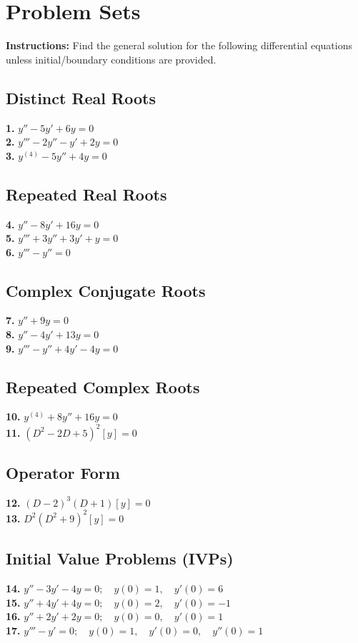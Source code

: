 \documentclass[12pt]{article}
\begin{document}
\newpage

\section{Problem Sets}
\textbf{Instructions:} Find the general solution for the following differential equations unless initial/boundary conditions are provided. 

\subsection*{Distinct Real Roots}
\textbf{1.} $y'' - 5y' + 6y = 0$ \\
\textbf{2.} $y''' - 2y'' - y' + 2y = 0$ \\
\textbf{3.} $y^{(4)} - 5y'' + 4y = 0$

\subsection*{Repeated Real Roots}
\textbf{4.} $y'' - 8y' + 16y = 0$ \\
\textbf{5.} $y''' + 3y'' + 3y' + y = 0$ \\
\textbf{6.} $y''' - y'' = 0$

\subsection*{Complex Conjugate Roots}
\textbf{7.} $y'' + 9y = 0$ \\
\textbf{8.} $y'' - 4y' + 13y = 0$ \\
\textbf{9.} $y''' - y'' + 4y' - 4y = 0$

\subsection*{Repeated Complex Roots}
\textbf{10.} $y^{(4)} + 8y'' + 16y = 0$ \\
\textbf{11.} $(D^2 - 2D + 5)^2[y] = 0$

\subsection*{Operator Form}
\textbf{12.} $(D-2)^3(D+1)[y] = 0$ \\
\textbf{13.} $D^2(D^2+9)^2[y] = 0$

\subsection*{Initial Value Problems (IVPs)}
\textbf{14.} $y'' - 3y' - 4y = 0; \quad y(0)=1, \quad y'(0)=6$ \\
\textbf{15.} $y'' + 4y' + 4y = 0; \quad y(0)=2, \quad y'(0)=-1$ \\
\textbf{16.} $y'' + 2y' + 2y = 0; \quad y(0)=0, \quad y'(0)=1$ \\
\textbf{17.} $y''' - y' = 0; \quad y(0)=1, \quad y'(0)=0, \quad y''(0)=1$
\end{document}
